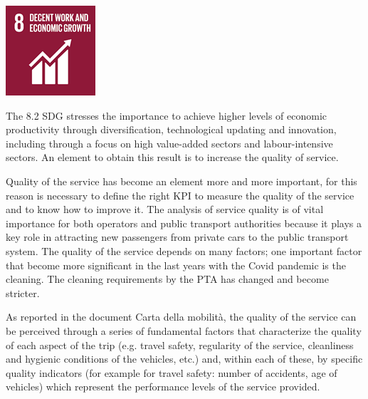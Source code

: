\begin{minipage}[c]{0.2\textwidth}
    \includegraphics[width=\textwidth]{Images/Social_sustainability/8_work.png}
\end{minipage}
\begin{minipage}[c]{0.8\textwidth}
The 8.2 SDG  stresses the importance to achieve higher levels of economic productivity through diversification, technological updating and innovation, including through a focus on high value-added sectors and labour-intensive sectors. An element to obtain this result is to increase the quality of service.
\end{minipage}
\hfill

Quality of the service has become an element more and more important, for this reason is necessary to define the right KPI to measure the quality of the service and to know how to improve it. The analysis of service quality is of vital importance for both operators and public transport authorities because it plays a key role in attracting new passengers from private cars to the public transport system. The quality of the service depends on many factors; one important factor that become more significant in the last years with the Covid pandemic is the cleaning. The cleaning requirements by the PTA has changed and become stricter.

As reported in the document Carta della mobilità,  the quality of the service can be perceived through a series of fundamental factors that characterize the quality of each aspect of the trip (e.g. travel safety, regularity of the service, cleanliness and hygienic conditions of the vehicles, etc.) and, within each of these, by specific quality indicators (for example for travel safety: number of accidents, age of vehicles) which represent the performance levels of the service provided.

